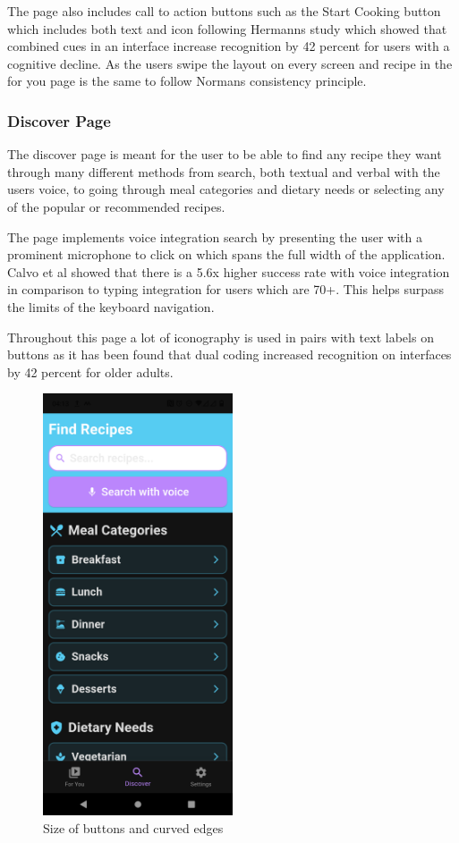 \documentclass[]{project_final}
\begin{document}
The page also includes call to action buttons such as the Start Cooking button which includes both text and icon following Hermanns study which showed that combined cues in an interface increase recognition by 42 percent for users with a cognitive decline.
As the users swipe the layout on every screen and recipe in the for you page is the same to follow Normans consistency principle.

\subsubsection{Discover Page}

The discover page is meant for the user to be able to find any recipe they want through many different methods from search, both textual and verbal with the users voice, to going through meal categories and dietary needs or selecting any of the popular or recommended recipes.

The page implements voice integration search by presenting the user with a prominent microphone to click on which spans the full width of the application. Calvo et al showed that there is a 5.6x higher success rate with voice integration in comparison to typing integration for users which are 70+. This helps surpass the limits of the keyboard navigation.

Throughout this page a lot of iconography is used in pairs with text labels on buttons as it has been found that dual coding increased recognition on interfaces by 42 percent for older adults.

\begin{figure}[ht!]
    \centering
    \includegraphics[width=0.5\textwidth]{mraDiscover.png}
    \caption{Size of buttons and curved edges}
    \label{fig:1}
\end{figure}
\end{document}
